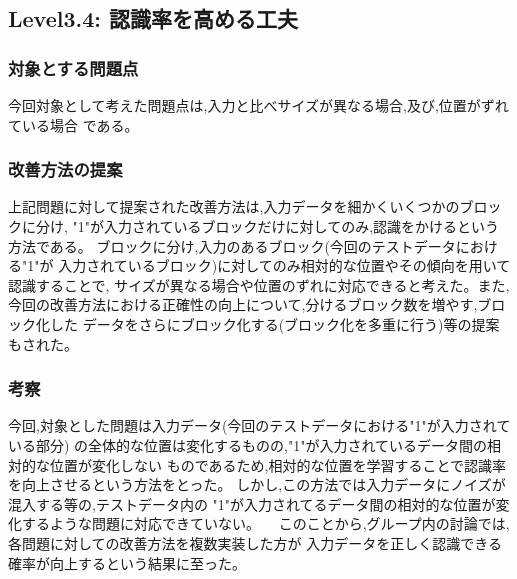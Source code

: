 \subsection{Level3.4: 認識率を高める工夫}
\subsubsection{対象とする問題点}
今回対象として考えた問題点は,入力と比べサイズが異なる場合,及び,位置がずれている場合
である。

\subsubsection{改善方法の提案}
上記問題に対して提案された改善方法は,入力データを細かくいくつかのブロックに分け,
"1"が入力されているブロックだけに対してのみ,認識をかけるという方法である。
ブロックに分け,入力のあるブロック(今回のテストデータにおける"1"が
入力されているブロック)に対してのみ相対的な位置やその傾向を用いて認識することで,
サイズが異なる場合や位置のずれに対応できると考えた。また,
今回の改善方法における正確性の向上について,分けるブロック数を増やす,ブロック化した
データをさらにブロック化する(ブロック化を多重に行う)等の提案もされた。

\subsubsection{考察}
今回,対象とした問題は入力データ(今回のテストデータにおける"1"が入力されている部分)
の全体的な位置は変化するものの,"1"が入力されているデータ間の相対的な位置が変化しない
ものであるため,相対的な位置を学習することで認識率を向上させるという方法をとった。
しかし,この方法では入力データにノイズが混入する等の,テストデータ内の
"1"が入力されてるデータ間の相対的な位置が変化するような問題に対応できていない。
　このことから,グループ内の討論では,各問題に対しての改善方法を複数実装した方が
入力データを正しく認識できる確率が向上するという結果に至った。


